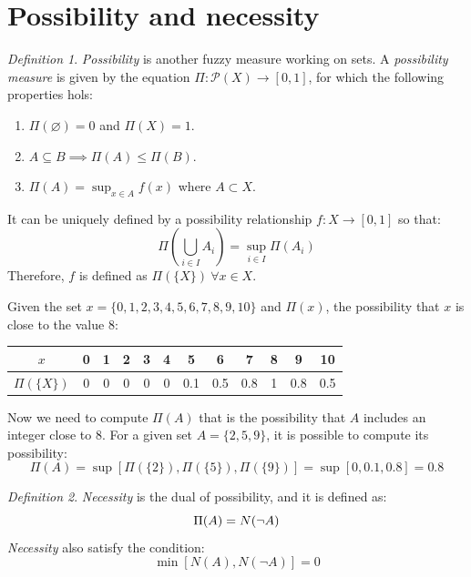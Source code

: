 \documentclass[12pt, a4paper]{report}
\theoremstyle{remark}
\newtheorem*{remark}{Definition}
\begin{document}
    \section{Possibility and necessity}
    \begin{remark}
        \emph{Possibility} is another fuzzy measure working on sets. A \emph{possibility measure} is given by the equation $\Pi : \mathcal{P}(X) \rightarrow [0,1]$,
        for which the following properties hols: 
        \begin{enumerate}
            \item $\Pi(\varnothing)=0$ and $\Pi(X)=1$.
            \item $A \subseteq B \implies \Pi(A) \leq \Pi(B)$. 
            \item $\Pi(A)=\sup_{x \in A} f(x)$ where $A \subset X$. 
        \end{enumerate}
    \end{remark}
    It can be uniquely defined by a possibility relationship $f:X \rightarrow [0,1]$ so that:
    \[\Pi\left(\bigcup_{i \in I}A_i\right)=\sup_{i \in I}\Pi\left(A_i\right)\]
    Therefore, $f$ is defined as $\Pi\left(\{X\}\right) \: \forall x \in X$.
    \begin{example}[Possibility]
        Given the set $x=\{0,1,2,3,4,5,6,7,8,9,10\}$ and $\Pi({x})$, the possibility that $x$ is close to the value $8$:
        \begin{center}
            \begin{tabular}{ | c | c | c | c | c | c | c | c | c | c | c | c | } 
            \hline
                $x$ & 0 & 1 & 2 & 3 & 4 & 5 & 6 & 7 & 8 & 9 & 10 \\ 
            \hline
                $\Pi\left(\{X\}\right)$ & 0 & 0 & 0 & 0 & 0 & 0.1 & 0.5 & 0.8 & 1 & 0.8 & 0.5 \\ 
            \hline
            \end{tabular}
        \end{center}
        Now we need to compute $\Pi(A)$ that is the possibility that $A$ includes an integer close to $8$.
        For a given set $A=\{2,5,9\}$, it is possible to compute its possibility: 
        \[\Pi(A)=\sup \left[\Pi\left(\{2\}\right), \Pi\left(\{5\}\right), \Pi\left(\{9\}\right)\right]=\sup\left[0,0.1,0.8\right]=0.8\]
    \end{example}

    \begin{remark}
        \emph{Necessity} is the dual of possibility, and it is defined as: 
        \[\Pi(A)=\-N(\lnot A)\]
        \emph{Necessity} also satisfy the condition: 
        \[\min\left[N(A),N(\lnot A)\right]=0\]
    \end{remark}
    
\end{document}
